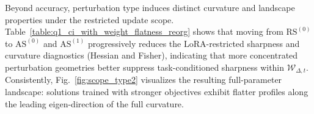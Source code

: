 \documentclass[10pt]{article} %
\begin{document}
Beyond accuracy, perturbation type induces distinct curvature and landscape properties under the restricted update scope.
Table~\ref{table:q1_ci_with_weight_flatness_reorg} shows that moving from $\mathrm{RS}^{(0)}$ to $\mathrm{AS}^{(0)}$ and $\mathrm{AS}^{(1)}$ progressively reduces the LoRA-restricted sharpness and curvature diagnostics (Hessian and Fisher), indicating that more concentrated perturbation geometries better suppress task-conditioned sharpness within $\mathcal W_{\Delta,t}$.
Consistently, Fig.~\ref{fig:scope_type2} visualizes the resulting {full-parameter} landscape: solutions trained with stronger objectives exhibit flatter profiles along the leading eigen-direction of the full curvature.

\end{document}
